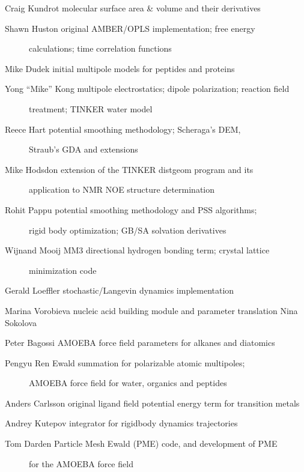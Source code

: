 \documentclass[letterpaper,11pt,english]{sphinxmanual}
\begin{document}
Craig Kundrot   molecular surface area \& volume and their derivatives
\begin{description}
\item[{Shawn Huston    original AMBER/OPLS implementation; free energy}] \leavevmode
calculations; time correlation functions

\end{description}

Mike Dudek      initial multipole models for peptides and proteins
\begin{description}
\item[{Yong “Mike” Kong        multipole electrostatics; dipole polarization; reaction field}] \leavevmode
treatment; TINKER water model

\item[{Reece Hart      potential smoothing methodology; Scheraga’s DEM,}] \leavevmode
Straub’s GDA and extensions

\item[{Mike Hodsdon    extension of the TINKER distgeom program and its}] \leavevmode
application to NMR NOE structure determination

\item[{Rohit Pappu     potential smoothing methodology and PSS algorithms;}] \leavevmode
rigid body optimization; GB/SA solvation derivatives

\item[{Wijnand Mooij   MM3 directional hydrogen bonding term; crystal lattice}] \leavevmode
minimization code

\end{description}

Gerald Loeffler stochastic/Langevin dynamics implementation

Marina Vorobieva        nucleic acid building module and parameter translation
Nina Sokolova

Peter Bagossi   AMOEBA force field parameters for alkanes and diatomics
\begin{description}
\item[{Pengyu Ren      Ewald summation for polarizable atomic multipoles;}] \leavevmode
AMOEBA force field for water, organics and peptides

\end{description}

Anders Carlsson original ligand field potential energy term for transition metals

Andrey Kutepov  integrator for rigid\sphinxhyphen{}body dynamics trajectories
\begin{description}
\item[{Tom Darden      Particle Mesh Ewald (PME) code, and development of PME}] \leavevmode
for the AMOEBA force field

\end{description}
\end{document}

